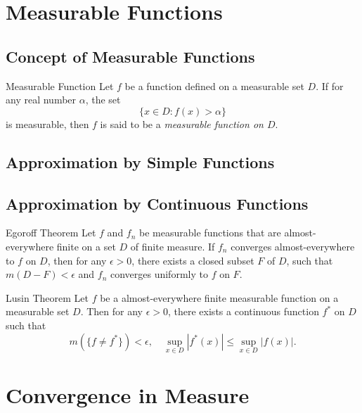 

\section{Measurable Functions}

\subsection{Concept of Measurable Functions}

\begin{definition}{Measurable Function}{}
  Let $f$ be a function defined on a measurable set $D$.
  If for any real number $\alpha$, the set
  \begin{equation}
    \{x \in D: f(x) > \alpha\}
  \end{equation}
  is measurable, then $f$ is said to be a \emph{measurable function on $D$}.
\end{definition}

\subsection{Approximation by Simple Functions}

\subsection{Approximation by Continuous Functions}

\begin{theorem}{Egoroff Theorem}{}
  Let $f$ and $f_n$ be measurable functions that are almost-everywhere finite
  on a set $D$ of finite measure.
  If $f_n$ converges almost-everywhere to $f$ on $D$,
  then for any $\epsilon > 0$, there exists a closed subset $F$ of $D$,
  such that $m(D - F) < \epsilon$
  and $f_n$ converges uniformly to $f$ on $F$.
\end{theorem}

\begin{theorem}{Lusin Theorem}{}
  Let $f$ be a almost-everywhere finite measurable function on a measurable set
  $D$.
  Then for any $\epsilon > 0$, there exists a continuous function $f^{\ast}$ on
  $D$ such that
  \begin{equation}
    m(\{f \neq f^{\ast}\}) < \epsilon, \quad
    \sup \limits_{x \in D} |f^{\ast}(x)| \leq \sup \limits_{x \in D} |f(x)|.
  \end{equation}
\end{theorem}


\section{Convergence in Measure}












